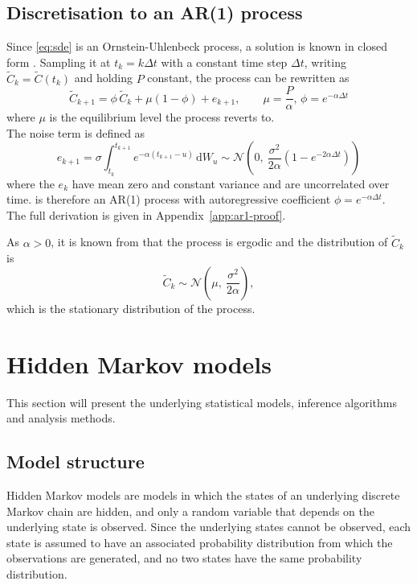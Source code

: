 \subsection{Discretisation to an AR(1) process}
Since \cref{eq:sde} is an Ornstein-Uhlenbeck process, a solution is known in closed form
\parencite[Sec.~1.13.1]{iacus2008}. Sampling it at $t_k = k\Delta t$ with a constant time step $\Delta t$,
writing $\tilde{C}_k = \tilde{C}(t_k)$ and holding $P$ constant, the process can be rewritten as
\begin{equation}
    \tilde{C}_{k+1} = \phi\, \tilde{C}_k
        + \mu \left(1 - \phi \right) + e_{k+1},
    \qquad \mu = \frac{P}{\alpha}, \, \phi = e^{-\alpha \Delta t}
    \label{eq:ar1}
\end{equation}
where $\mu$ is the equilibrium level the process reverts to. \\
The noise term is defined as
\begin{equation}
    e_{k+1} = \sigma \int_{t_k}^{t_{k+1}} e^{-\alpha (t_{k+1}-u)} \, \mathrm{d}W_u
    \sim \mathcal{N}\!\left(0,\ \frac{\sigma^2}{2\alpha}\left(1 - e^{-2\alpha \Delta t}\right)\right)
\end{equation}
where the $e_k$ have mean zero and constant variance and are uncorrelated over time.
 is therefore an AR(1) process with autoregressive coefficient
$\phi = e^{-\alpha \Delta t}$. \\
The full derivation is given in Appendix~\ref{app:ar1-proof}.\\
\bigskip

As $\alpha > 0$, it is known from \textcite[Sec.~1.13.1]{iacus2008} that the process is ergodic and the distribution of $\tilde{C}_k$ is
\begin{equation}
    \tilde{C}_k \sim \mathcal{N}\!\left(\mu,\ \frac{\sigma^2}{2\alpha}\right),
\end{equation}
which is the stationary distribution of the process. \\



\section{Hidden Markov models}
This section will present the underlying statistical models, inference algorithms and analysis methods. 

\subsection{Model structure}
Hidden Markov models are models in which the states of an underlying discrete Markov chain are hidden,
and only a random variable that depends on the underlying state is observed.
Since the underlying states cannot be observed, each state is assumed to have an associated probability
distribution from which the observations are generated, and no two states have the same probability distribution.

